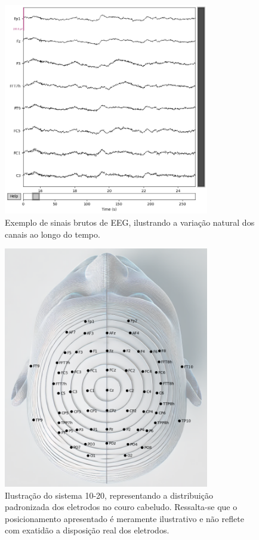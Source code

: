 \begin{figure}[htb]
    \centering
    \includegraphics[width=0.8\textwidth]{figs/1_preprocessamento_eeg/2_exemplo_sinais_canais_eeg.png}
    \caption{Exemplo de sinais brutos de EEG, ilustrando a variação natural dos canais ao longo do tempo.}
    \label{fig:exemplo_sinais_eeg}
\end{figure}

\begin{figure}[htb]
    \centering
    \includegraphics[width=0.8\textwidth]{figs/1_preprocessamento_eeg/1_sistema_10_20.png}
    \caption{Ilustração do sistema 10-20, representando a distribuição padronizada dos eletrodos no couro cabeludo. Ressalta-se que o posicionamento apresentado é meramente ilustrativo e não reflete com exatidão a disposição real dos eletrodos.}
    \label{fig:sistema_10_20}
\end{figure}



